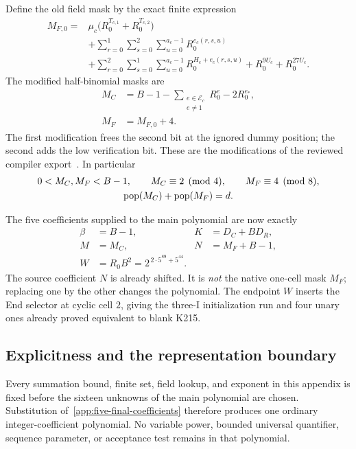 Define the old field mask by the exact finite expression
\begin{align}
 M_{F,0}={}&\mu_c\bigl(R_0^{T_{c,1}}+R_0^{T_{c,2}}\bigr)
 \nonumber\\
 &+\sum_{r=0}^{1}\sum_{s=0}^{2}\sum_{u=0}^{a_c-1}
       R_0^{e_c(r,s,u)}
 \nonumber\\
 &+\sum_{r=0}^{2}\sum_{s=0}^{1}\sum_{u=0}^{a_c-1}
       R_0^{H_c+e_c(r,s,u)}
       +R_0^{9U_c}+R_0^{27U_c}.
 \label{app:old-field-mask}
\end{align}
The modified half-binomial masks are
\begin{align}
 M_C&=B-1-\sum_{\substack{e\in\mathcal E_c\\e\ne1}}R_0^e
           -2R_0^{e_*},\label{app:native-mask}\\
 M_F&=M_{F,0}+4.\label{app:field-mask}
\end{align}
The first modification frees the second bit at the ignored dummy position;
the second adds the low verification bit. These are the modifications of
the reviewed compiler export~\cite{CompilerDetails}. In particular
\begin{gather*}
 0<M_C,M_F<B-1,\qquad
 M_C\equiv2\pmod4,\qquad M_F\equiv4\pmod8,\\
 \operatorname{pop}(M_C)+\operatorname{pop}(M_F)=d.
\end{gather*}

The five coefficients supplied to the main polynomial are now exactly
\begin{equation}\label{app:five-final-coefficients}
 \boxed{
 \begin{aligned}
 \beta&=B-1,&K&=D_C+BD_R,\\
 M&=M_C,&N&=M_F+B-1,\\
 W&=R_0B^2=2^{\,2\cdot5^{89}+5^{44}}.
 \end{aligned}}
\end{equation}
The source coefficient $N$ is already shifted. It is \emph{not} the
native one-cell mask $M_F$; replacing one by the other changes the
polynomial. The endpoint $W$ inserts the End selector at cyclic cell $2$,
giving the three-I initialization run and four unary ones already proved
equivalent to blank K215.

\subsection{Explicitness and the representation boundary}

Every summation bound, finite set, field lookup, and exponent in this
appendix is fixed before the sixteen unknowns of the main polynomial
are chosen. Substitution of~\eqref{app:five-final-coefficients} therefore
produces one ordinary integer-coefficient polynomial. No variable power,
bounded universal quantifier, sequence parameter, or acceptance test
remains in that polynomial.

